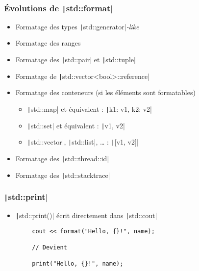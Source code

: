 \documentclass[C++.tex]{subfiles}
\begin{document}
\begin{frame}[fragile]
	\frametitle{Évolutions de \texttt|std::format|}
	\begin{itemize}
		\item Formatage des types \texttt|std::generator|\textit{-like}
		\item Formatage des ranges
		\item Formatage des \texttt|std::pair| et \texttt|std::tuple|
		\item Formatage de \texttt|std::vector<bool>::reference|
		\item Formatage des conteneurs (si les éléments sont formatables)
		\begin{itemize}
			\item \texttt|std::map| et équivalent : \texttt|{k1: v1, k2: v2}|
			\item \texttt|std::set| et équivalent : \texttt|{v1, v2}|
			\item \texttt|std::vector|, \texttt|std::list|, \ldots{} : \texttt|[v1, v2]|
		\end{itemize}
		\item Formatage des \texttt|std::thread::id|
		\item Formatage des \texttt|std::stacktrace|
	\end{itemize}

\end{frame}

\begin{frame}[fragile]
	\frametitle{\texttt|std::print|}
	\begin{itemize}
		\item \texttt|std::print()| écrit directement dans \texttt|std::cout|
	\end{itemize}

	\begin{verbatim}
		cout << format("Hello, {}!", name);

		// Devient

		print("Hello, {}!", name);
	\end{verbatim}

\end{frame}
\end{document}
